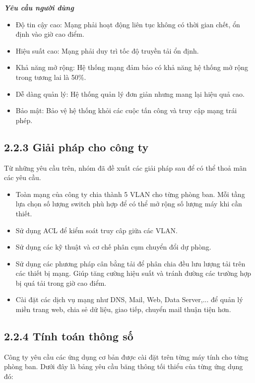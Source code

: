 \textbf{\textit{Yêu cầu người dùng}}
\begin{itemize}[left=2.5cm]
    \item Độ tin cậy cao: Mạng phải hoạt động liên tục không có thời gian chết, ổn định vào giờ cao điểm.
    \item Hiệu suất cao: Mạng phải duy trì tốc độ truyền tải ổn định.
    \item Khả năng mở rộng: Hệ thống mạng đảm bảo có khả năng hệ thống mở rộng trong tương lai là 50\%.
    \item Dễ dàng quản lý: Hệ thống quản lý đơn giản nhưng mang lại hiệu quả cao.
    \item Bảo mật: Bảo vệ hệ thống khỏi các cuộc tấn công và truy cập mạng trái phép.
\end{itemize}

\subsection*{2.2.3 Giải pháp cho công ty}

Từ những yêu cầu trên, nhóm đã đề xuất các giải pháp sau để có thể thoả mãn các yêu cầu.
\begin{itemize}[left=2.5cm]
    \item Toàn mạng của công ty chia thành 5 VLAN cho từng phòng ban. Mỗi tầng lựa chọn số lượng switch phù hợp để có thể mở rộng số lượng máy khi cần thiết.
    \item Sử dụng ACL để kiểm soát truy câp giữa các VLAN.
    \item Sử dụng các kỹ thuật và cơ chế phân cụm chuyển đổi dự phòng.
    \item Sử dụng các phương pháp cân bằng tải để phân chia đều lưu lượng tải trên các thiết bị mạng. Giúp tăng cường hiệu suất và tránh đường các trường hợp bị quá tải trong giờ cao điểm.
    \item Cài đặt các dịch vụ mạng như DNS, Mail, Web, Data Server,... để quản lý miền trang web, chia sẻ dữ liệu, giao tiếp, chuyển mail thuận tiện hơn. 
\end{itemize}

\subsection*{2.2.4 Tính toán thông số}
Công ty yêu cầu các ứng dụng cơ bản được cài đặt trên từng máy tính cho từng phòng ban. Dưới đây là bảng yêu cầu băng thông tối thiểu của từng ứng dụng đó:

